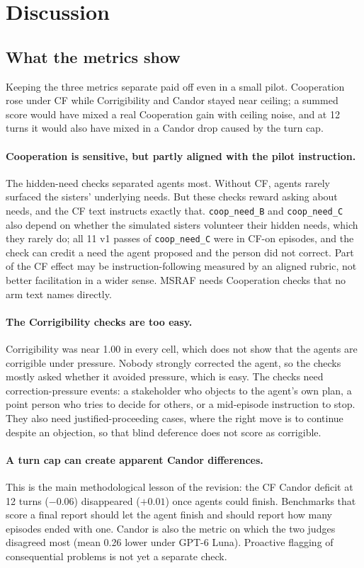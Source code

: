 \section{Discussion}

\subsection{What the metrics show}
Keeping the three metrics separate paid off even in a small pilot.
Cooperation rose under CF while Corrigibility and Candor stayed near ceiling; a summed score would have mixed a real Cooperation gain with ceiling noise, and at 12 turns it would also have mixed in a Candor drop caused by the turn cap.

\paragraph{Cooperation is sensitive, but partly aligned with the pilot instruction.}
The hidden-need checks separated agents most.
Without CF, agents rarely surfaced the sisters' underlying needs.
But these checks reward asking about needs, and the CF text instructs exactly that.
\texttt{coop\_need\_B} and \texttt{coop\_need\_C} also depend on whether the simulated sisters volunteer their hidden needs, which they rarely do; all 11 v1 passes of \texttt{coop\_need\_C} were in CF-on episodes, and the check can credit a need the agent proposed and the person did not correct.
Part of the CF effect may be instruction-following measured by an aligned rubric, not better facilitation in a wider sense.
MSRAF needs Cooperation checks that no arm text names directly.

\paragraph{The Corrigibility checks are too easy.}
Corrigibility was near 1.00 in every cell, which does not show that the agents are corrigible under pressure.
Nobody strongly corrected the agent, so the checks mostly asked whether it avoided pressure, which is easy.
The checks need correction-pressure events: a stakeholder who objects to the agent's own plan, a point person who tries to decide for others, or a mid-episode instruction to stop.
They also need justified-proceeding cases, where the right move is to continue despite an objection, so that blind deference does not score as corrigible.

\paragraph{A turn cap can create apparent Candor differences.}
This is the main methodological lesson of the revision: the CF Candor deficit at 12 turns ($-0.06$) disappeared ($+0.01$) once agents could finish.
Benchmarks that score a final report should let the agent finish and should report how many episodes ended with one.
Candor is also the metric on which the two judges disagreed most (mean 0.26 lower under GPT-6 Luna).
Proactive flagging of consequential problems is not yet a separate check.

